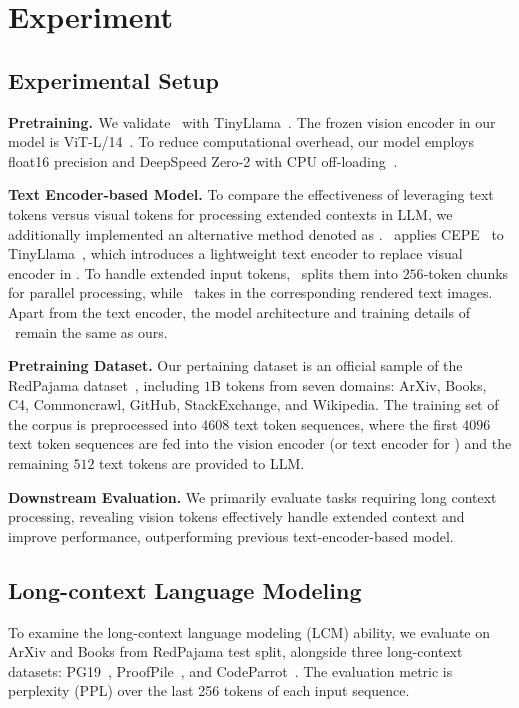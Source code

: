 \section{Experiment}
\label{sec::experi}

\subsection{Experimental Setup}
\noindent\textbf{Pretraining.}$_{\!}$ We validate \ourname\ with TinyLlama~\cite{zhang2024tinyllama}. The frozen vision encoder in our model is ViT-L/14~\cite{radford2021learning}. 
To reduce computational overhead, our model employs float16 precision and DeepSpeed Zero-2 with CPU off-loading~$_{\!\!}$\cite{rasley2020deepspeed}.  


\noindent\textbf{Text Encoder-based Model.} 
To compare the effectiveness of leveraging text tokens versus visual tokens for processing extended contexts in LLM, we additionally implemented an alternative method denoted as \mytext. 
\mytext\ applies CEPE~\cite{yen2024long} to TinyLlama~\cite{zhang2024tinyllama}, which introduces a lightweight text encoder to replace visual encoder in \ourname.
To handle extended input tokens, \mytext\ splits them into $256$-token chunks for parallel processing, while \ourname\ takes in the corresponding rendered text images. 
Apart from the text encoder, the model architecture and training details of \mytext\ remain the same as ours.


 
\noindent\textbf{Pretraining Dataset.} Our pertaining dataset is an official sample of the RedPajama dataset~\cite{weberredpajama}, including $1$B tokens from seven domains: ArXiv, Books, C4, Commoncrawl, GitHub, StackExchange, and Wikipedia. The training set of the corpus is preprocessed into $4608$ text token sequences, where the first $4096$ text token sequences are fed into the vision encoder (or text encoder for \mytext) and the remaining $512$ text tokens are provided to LLM.

\noindent\textbf{Downstream Evaluation.} 
We primarily evaluate tasks requiring long context processing, revealing vision tokens effectively handle extended context and improve performance, outperforming previous text-encoder-based model.

% 
\subsection{Long-context Language Modeling} To examine the long-context language modeling (LCM) ability, we evaluate on ArXiv and Books from RedPajama test split, alongside three long-context datasets: PG19~\cite{raecompressive}, ProofPile~\cite{azerbayev2023proofpile}, and CodeParrot~\cite{codep}. 
The evaluation metric is perplexity (PPL) over the last 256 tokens of each input sequence. 

